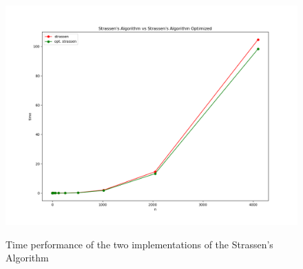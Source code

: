 \documentclass{article}
\begin{document}
	\begin{figure}[h]
		\begin{center}
			\includegraphics[width=.8\textwidth]{../data/plot.png}
			\label{plot}
			\caption{Time performance of the two implementations of the Strassen's Algorithm}
		\end{center}
	\end{figure}	
	
	
\end{document}
